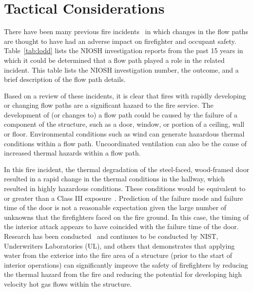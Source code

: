 \documentclass[12pt,oneside]{book}
\begin{document}
\clearpage


\section{Tactical Considerations}
There have been many previous fire incidents~\cite{NIOSH:Pettit,NIOSH:Washenitz,NIOSH:Mezzanotte,NIOSH:McFall,NIOSH:McFall2,NIOSH:McFall3,NIOSH:Berardinelli,NIOSH:Koedam,NIOSH:McFall4,NIOSH:Tarley,NIOSH:Braddee,NIOSH:Merinar,NIOSH:Bowyer2,NIOSH:Loflin,NIOSH:Bowyer} in which changes in the flow paths are thought to have had an adverse impact on firefighter and occupant safety. Table~\ref{tab:lodd} lists the NIOSH investigation reports from the past 15 years in which it could be determined that a flow path played a role in the related incident. This table lists the NIOSH investigation number, the outcome, and a brief description of the flow path details.

Based on a review of these incidents, it is clear that fires with rapidly developing or changing flow paths are a significant hazard to the fire service. The development of (or changes to) a flow path could be caused by the failure of a component of the structure, such as a door, window, or portion of a ceiling, wall or floor. Environmental conditions such as wind can generate hazardous thermal conditions within a flow path. Uncoordinated ventilation can also be the cause of increased thermal hazards within a flow path. 

In this fire incident, the thermal degradation of the steel-faced, wood-framed door resulted in a rapid change in the thermal conditions in the hallway, which resulted in highly hazardous conditions. These conditions would be equivalent to or greater than a Class III exposure~\cite{Donnelly2006}. Prediction of the failure mode and failure time of the door is not a reasonable expectation given the large number of unknowns that the firefighters faced on the fire ground.  In this case, the timing of the interior attack appears to have coincided with the failure time of the door. Research has been conducted~\cite{madrzykowski2009fire, kerber2009fire} and continues to be conducted by NIST, Underwriters Laboratories (UL), and others that demonstrates that applying water from the exterior into the fire area of a structure (prior to the start of interior operations) can significantly improve the safety of firefighters by reducing the thermal hazard from the fire and reducing the potential for developing high velocity hot gas flows within the structure.
\end{document}
